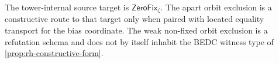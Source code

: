 \begin{principle}
\label{prin:rh-layered-constructive-orbit-boundary}
The tower-internal source target is $\mathsf{ZeroFix}_{\zeta}$. The apart
orbit exclusion is a constructive route to that target only when paired
with located equality transport for the bias coordinate. The weak
non-fixed orbit exclusion is a refutation schema and does not by itself
inhabit the BEDC witness type of \autoref{prop:rh-constructive-form}.
\end{principle}

